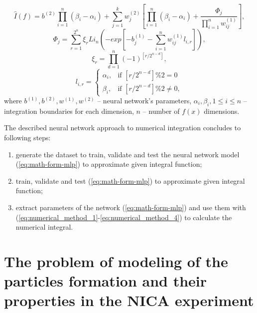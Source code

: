 \documentclass[%
]{ittmm}
\begin{document}
\begin{equation}
        \label{eq:numerical_method_1}
            \hat{I}(f) = b^{(2)}\prod_{i=1}^{n}(\beta_i - \alpha_i) + \sum_{j=1}^{k}w_j^{(2)}[\prod_{i=1}^{n}(\beta_i - \alpha_i) + \frac{\Phi_j}{\prod_{i=1}^{n}w_{ij}^{(1)}}],
        \end{equation}
        \begin{equation}
        \label{eq:numerical_method_2}
            \Phi_j = \sum_{r=1}^{2^n}\xi_{r}Li_n(-exp[-b_j^{(1)} - \sum_{i=1}^{n}w_{ij}^{(1)}l_{i,r}]),
        \end{equation}
        \begin{equation}
        \label{eq:numerical_method_3}
            \xi_{r} = \prod_{d=1}^{n}(-1)^{[{r}/{2^{n-d}}]},
        \end{equation}
        \begin{equation}
        \label{eq:numerical_method_4}
            l_{i,r} = \left\{
            \begin{array}{ll}
                \alpha_i, & \text{if } [{r}/{2^{n-d}}] \% 2 = 0 \\
                \beta_i, & \text{if } [{r}/{2^{n-d}}] \% 2 \neq 0,
            \end{array}
        \right.
\end{equation}
    where $b^{(1)}, b^{(2)}, w^{(1)}, w^{(2)}$ -- neural network's parameters, $\alpha_i, \beta_i, 1 \leq i \leq n$ -- integration boundaries for each dimension, $n$ -- number of $ f(x) $ dimensions.

The described neural network approach to numerical integration concludes to following steps:

\begin{enumerate}
    \item generate the dataset to train, validate and test the neural network model (\ref{eq:math-form-mlp}) to approximate given integral function;
    \item train, validate and test (\ref{eq:math-form-mlp}) to approximate given integral function;
    \item extract parameters of the network (\ref{eq:math-form-mlp}) and use them with (\ref{eq:numerical_method_1}-\ref{eq:numerical_method_4}) to calculate the numerical integral.
\end{enumerate}

\section{The problem of modeling of the particles formation and their properties in the NICA experiment}
\end{document}
